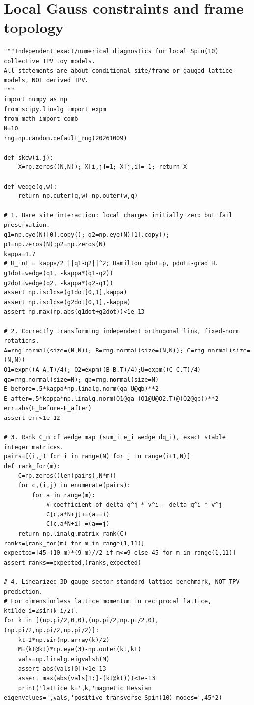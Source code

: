 \documentclass[11pt,oneside]{report}
\begin{document}
\section{Local Gauss constraints and frame topology}
\noindent{}\par
\begin{Verbatim}[breaklines=true,breakanywhere=true,fontsize=\scriptsize]
"""Independent exact/numerical diagnostics for local Spin(10) collective TPV toy models.
All statements are about conditional site/frame or gauged lattice models, NOT derived TPV.
"""
import numpy as np
from scipy.linalg import expm
from math import comb
N=10
rng=np.random.default_rng(20261009)

def skew(i,j):
    X=np.zeros((N,N)); X[i,j]=1; X[j,i]=-1; return X

def wedge(q,w):
    return np.outer(q,w)-np.outer(w,q)

# 1. Bare site interaction: local charges initially zero but fail preservation.
q1=np.eye(N)[0].copy(); q2=np.eye(N)[1].copy(); p1=np.zeros(N);p2=np.zeros(N)
kappa=1.7
# H_int = kappa/2 ||q1-q2||^2; Hamilton qdot=p, pdot=-grad H.
g1dot=wedge(q1, -kappa*(q1-q2))
g2dot=wedge(q2, -kappa*(q2-q1))
assert np.isclose(g1dot[0,1],kappa)
assert np.isclose(g2dot[0,1],-kappa)
assert np.max(np.abs(g1dot+g2dot))<1e-13

# 2. Correctly transforming independent orthogonal link, fixed-norm rotations.
A=rng.normal(size=(N,N)); B=rng.normal(size=(N,N)); C=rng.normal(size=(N,N))
O1=expm((A-A.T)/4); O2=expm((B-B.T)/4);U=expm((C-C.T)/4)
qa=rng.normal(size=N); qb=rng.normal(size=N)
E_before=.5*kappa*np.linalg.norm(qa-U@qb)**2
E_after=.5*kappa*np.linalg.norm(O1@qa-(O1@U@O2.T)@(O2@qb))**2
err=abs(E_before-E_after)
assert err<1e-12

# 3. Rank C_m of wedge map (sum_i e_i wedge dq_i), exact stable integer matrices.
pairs=[(i,j) for i in range(N) for j in range(i+1,N)]
def rank_for(m):
    C=np.zeros((len(pairs),N*m))
    for c,(i,j) in enumerate(pairs):
        for a in range(m):
            # coefficient of delta q^j * v^i - delta q^i * v^j
            C[c,a*N+j]+=(a==i)
            C[c,a*N+i]-=(a==j)
    return np.linalg.matrix_rank(C)
ranks=[rank_for(m) for m in range(1,11)]
expected=[45-(10-m)*(9-m)//2 if m<=9 else 45 for m in range(1,11)]
assert ranks==expected,(ranks,expected)

# 4. Linearized 3D gauge sector standard lattice benchmark, NOT TPV prediction.
# For dimensionless lattice momentum in reciprocal lattice, ktilde_i=2sin(k_i/2).
for k in [(np.pi/2,0,0),(np.pi/2,np.pi/2,0),(np.pi/2,np.pi/2,np.pi/2)]:
    kt=2*np.sin(np.array(k)/2)
    M=(kt@kt)*np.eye(3)-np.outer(kt,kt)
    vals=np.linalg.eigvalsh(M)
    assert abs(vals[0])<1e-13
    assert max(abs(vals[1:]-(kt@kt)))<1e-13
    print('lattice k=',k,'magnetic Hessian eigenvalues=',vals,'positive transverse Spin(10) modes=',45*2)


\end{Verbatim}
\end{document}
